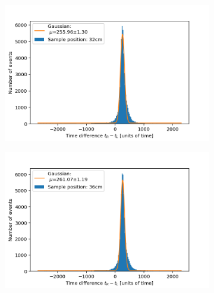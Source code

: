 \documentclass[]{article}
\begin{document}
\begin{figure}[H]
\medskip
\begin{subfigure}{0.48\textwidth}
\includegraphics[width=\linewidth]{Plots/Pos/32cm.png}
\end{subfigure}
\begin{subfigure}[c]{0.48\linewidth}
\includegraphics[width=\linewidth]{Plots/Pos/36cm.png}
\end{subfigure}


\end{figure}
\end{document}
